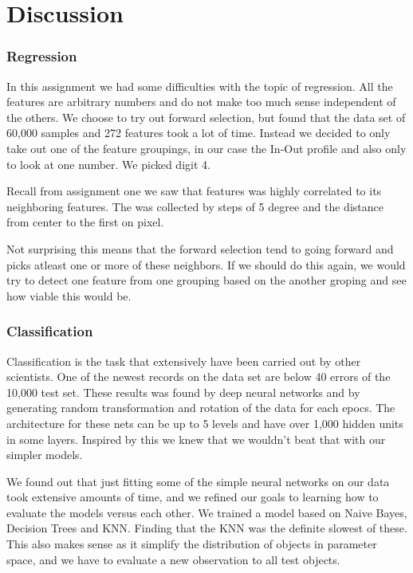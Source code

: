 \chapter{Discussion}
\subsection{Regression}
In this assignment we had some difficulties with the topic of regression. All the features are arbitrary numbers and do not make too much sense independent of the others. We choose to try out forward selection, but found that the data set of 60,000 samples and 272 features took a lot of time. Instead we decided to only take out one of the feature groupings, in our case the In-Out profile and also only to look at one number. We picked digit 4.

Recall from assignment one we saw that features was highly correlated to its neighboring features. The was collected by steps of 5 degree and the distance from center to the first on pixel. 

Not surprising this means that the forward selection tend to going forward and picks atleast one or more of these neighbors. If we should do this again, we would try to detect one feature from one grouping based on the another groping and see how viable this would be. 

\subsection{Classification}
Classification is the task that extensively have been carried out by other scientists. One of the newest records on the data set are below 40 errors of the 10,000 test set. These results was found by deep neural networks and by generating random transformation and rotation of the data for each epocs. The architecture for these nets can be up to 5 levels and have over 1,000 hidden units in some layers. Inspired by this we knew that we wouldn't beat that with our simpler models. 

We found out that just fitting some of the simple neural networks on our data took extensive amounts of time, and we refined our goals to learning how to evaluate the models versus each other. We trained a model based on Naive Bayes, Decision Trees and KNN. Finding that the KNN was the definite slowest of these. This also makes sense as it simplify the distribution of objects in parameter space, and we have to evaluate a new observation to all test objects.

